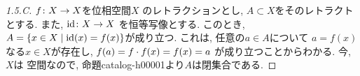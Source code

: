 \documentclass[uplatex, dvipdfmx, a4paper, 12pt, class=jsarticle, crop=false]{standalone}
\begin{document}
\begin{proof}[1.5.C]\label{eng-1-5-C-proof}
	\( f\colon X\to X \)を位相空間\( X \)
	のレトラクションとし,
	\( A \subset X \)をそのレトラクトとする.
	また, \( \mathrm{id}\colon X\to X \)
	を恒等写像とする.
	このとき, \( A = \setcomp{x \in X}
	{\mathrm{id}(x) = f(x)} \)が成り立つ.
	これは, 任意の\( a \in A \)について
	\( a = f(x) \)なる\( x \in X \)が存在し,
	\( f(a) = f \cdot f(x) = f(x) = a\)
	が成り立つことからわかる.
	今, \( X \)は \Hausdorff 空間なので,
	命題catalog-h00001より\( A \)は閉集合である.
\end{proof}
\end{document}
